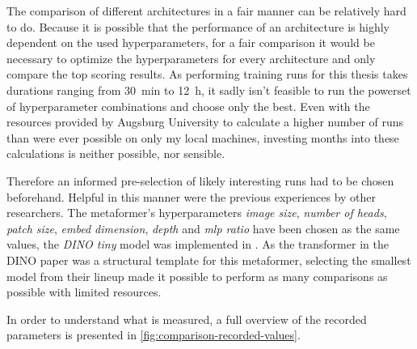 The comparison of different architectures in a fair manner can be relatively hard to do.
Because it is possible that the performance of an architecture is highly dependent on the used hyperparameters, for a fair comparison it would be necessary to optimize the hyperparameters for every architecture and only compare the top scoring results.
As performing training runs for this thesis takes durations ranging from \SI[]{30}[]{\minute} to \SI[]{12}[]{\hour}, it sadly isn't feasible to run the powerset of hyperparameter combinations and choose only the best.
Even with the resources provided by Augsburg University to calculate a higher number of runs than were ever possible on only my local machines, investing months into these calculations is neither possible, nor sensible.

Therefore an informed pre-selection of likely interesting runs had to be chosen beforehand.
Helpful in this manner were the previous experiences by other researchers. 
The metaformer's hyperparameters \emph{image size}, \emph{number of heads}, \emph{patch size}, \emph{embed dimension}, \emph{depth} and \emph{mlp ratio} have been chosen as the same values, the \emph{DINO tiny} model was implemented in \cite{dinoGithub}. As the transformer in the DINO paper \cite{dinoPaper} was a structural template for this metaformer, selecting the smallest model from their lineup made it possible to perform as many comparisons as possible with limited resources.

In order to understand what is measured, a full overview of the recorded parameters is presented in \autoref{fig:comparison-recorded-values}.

